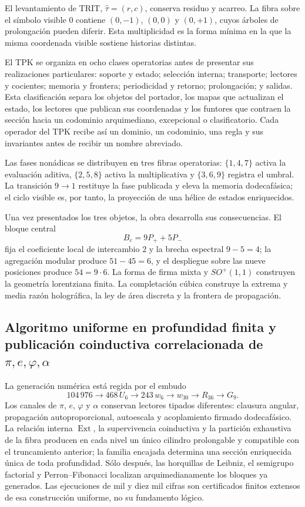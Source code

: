 El levantamiento de TRIT, \(\widehat\tau=(r,c)\), conserva residuo y acarreo. La fibra
sobre el símbolo visible \(0\) contiene \((0,-1)\), \((0,0)\) y
\((0,+1)\), cuyos árboles de prolongación pueden diferir. Esta multiplicidad
es la forma mínima en la que la misma coordenada visible sostiene historias
distintas.

El TPK se organiza en ocho clases operatorias antes de presentar sus
realizaciones particulares: soporte y estado; selección interna; transporte;
lectores y cocientes; memoria y frontera; periodicidad y retorno;
prolongación; y salidas. Esta clasificación separa los objetos del portador,
los mapas que actualizan el estado, los lectores que publican sus coordenadas
y los funtores que contraen la sección hacia un codominio arquimediano,
excepcional o clasificatorio. Cada operador del TPK recibe así un dominio, un
codominio, una regla y sus invariantes antes de recibir un nombre abreviado.

Las fases nonádicas se distribuyen en tres fibras operatorias:
\(\{1,4,7\}\) activa la evaluación aditiva, \(\{2,5,8\}\) activa la
multiplicativa y \(\{3,6,9\}\) registra el umbral. La transición
\(9\to1\) restituye la fase publicada y eleva la memoria dodecafásica; el
ciclo visible es, por tanto, la proyección de una hélice de estados
enriquecidos.

Una vez presentados los tres objetos, la obra desarrolla sus consecuencias.
El bloque central
\[
 B_c=9P_++5P_-
\]
fija el coeficiente local de intercambio \(2\) y la brecha espectral
\(9-5=4\); la agregación modular produce \(51-45=6\), y el despliegue sobre
las nueve posiciones produce \(54=9\cdot6\). La forma de firma mixta y
\(SO^+(1,1)\) construyen la geometría lorentziana finita. La completación
cúbica construye la extrema y media razón holográfica, la ley de área
discreta y la frontera de propagación.

\subsection*{Algoritmo uniforme en profundidad finita y publicación coinductiva
correlacionada de \texorpdfstring{\(\pi,e,\varphi,\alpha\)}{pi, e, phi, alpha}}

La generación numérica está regida por el embudo
\[
 104\,976\to468\,U_6\to243\,w_6
 \to w_{30}\to R_{36}\to G_9.
\]
Los canales de \(\pi\), \(e\), \(\varphi\) y \(\alpha\) conservan lectores
tipados diferentes: clausura angular, propagación autoproporcional,
autoescala y acoplamiento firmado dodecafásico. La relación interna
\(\operatorname{Ext}\), la supervivencia coinductiva y la partición
exhaustiva de la fibra producen en cada nivel un único cilindro prolongable
y compatible con el truncamiento anterior; la familia encajada determina
una sección enriquecida única de toda profundidad. Sólo después, las
horquillas de Leibniz, el semigrupo factorial y Perron--Fibonacci localizan
arquimedianamente los bloques ya generados. Las ejecuciones de mil y diez mil
cifras son certificados finitos extensos de esa construcción uniforme, no su
fundamento lógico.

